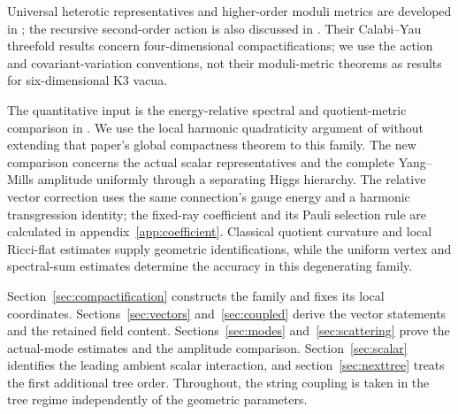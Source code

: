 Universal heterotic representatives and higher-order moduli metrics are
developed in \cite{candelas,mcorist_sticka_svanes,mcorist_yin}; the recursive
second-order action is also discussed in \cite{mcorist_picard}.
Their Calabi--Yau threefold results concern four-dimensional
compactifications; we use the action and covariant-variation conventions,
not their moduli-metric theorems as results for six-dimensional K3 vacua.

The quantitative input is the energy-relative spectral and quotient-metric
comparison in \cite{wuebben15}. We use the local harmonic quadraticity
argument of \cite{wuebben20} without extending that paper's global
compactness theorem to this family. The new comparison concerns the actual scalar representatives and the
complete Yang--Mills amplitude uniformly through a separating Higgs
hierarchy. The relative vector correction uses the same connection's
gauge energy and a harmonic transgression identity; the fixed-ray
coefficient and its Pauli selection rule are calculated in
appendix~\ref{app:coefficient}. Classical quotient curvature and local
Ricci-flat estimates supply geometric identifications, while the
uniform vertex and spectral-sum estimates determine the accuracy in
this degenerating family.

Section~\ref{sec:compactification} constructs the family and fixes its
local coordinates. Sections~\ref{sec:vectors} and~\ref{sec:coupled}
derive the vector statements and the retained field content.
Sections~\ref{sec:modes} and~\ref{sec:scattering} prove the actual-mode
estimates and the amplitude comparison. Section~\ref{sec:scalar}
identifies the leading ambient scalar interaction, and
section~\ref{sec:nexttree} treats the first additional tree order.
Throughout, the string coupling is taken in the tree regime independently
of the geometric parameters.
